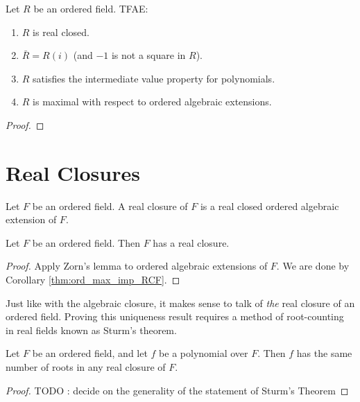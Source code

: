 \begin{theorem}
  \label{thm:RCF_tfae}
  Let $R$ be an ordered field. TFAE:
  \begin{enumerate}
    \item $R$ is real closed.
    \item $\bar{R}=R(i)$ (and $-1$ is not a square in $R$).
    \item $R$ satisfies the intermediate value property for polynomials.
    \item $R$ is maximal with respect to ordered algebraic extensions.
  \end{enumerate}
\end{theorem}
\begin{proof}
\end{proof}

\section{Real Closures}

\begin{definition}
  \label{def:real_closure}
  \leanok
  Let $F$ be an ordered field. A real closure of $F$ is a real closed ordered algebraic extension of $F$.
\end{definition}

\begin{lemma}
  \label{lem:real_closure_exists}
  Let $F$ be an ordered field. Then $F$ has a real closure.
\end{lemma}
\begin{proof}
  Apply Zorn's lemma to ordered algebraic extensions of $F$. We are done by Corollary \ref{thm:ord_max_imp_RCF}.
\end{proof}

Just like with the algebraic closure, it makes sense to talk of \textit{the} real closure of an ordered field. Proving this uniqueness result requires a method of root-counting in real fields known as Sturm's theorem.

\begin{theorem}
  \label{thm:Sturm}
  Let $F$ be an ordered field, and let $f$ be a polynomial over $F$. Then $f$ has the same number of roots in any real closure of $F$.
\end{theorem}
\begin{proof}
  TODO : decide on the generality of the statement of Sturm's Theorem
\end{proof}


